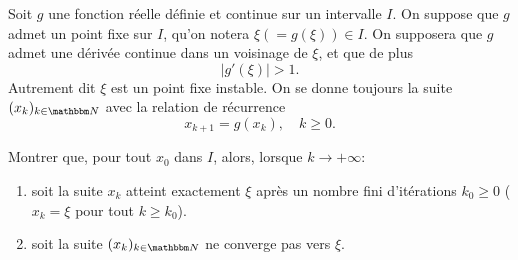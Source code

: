 \begin{exercice}

Soit $g$ une fonction réelle définie et continue sur un intervalle $I$. On suppose que $g$ admet un point fixe sur $I$,
qu'on notera $\xi (= g(\xi)) \in I$. %
On supposera que $g$ admet une dérivée continue dans un voisinage de $\xi$, et que de plus
\[
| g'(\xi) | > 1.
\]
Autrement dit $\xi$ est un point fixe instable.
On se donne toujours la suite $(x_k)_{k\in\eN}$ avec la relation de récurrence 
$$x_{k+1} = g(x_k),\quad k\geq0.$$

Montrer que, pour tout $x_0$ dans $I$, %
alors, lorsque $k\rightarrow +\infty$:
\begin{enumerate}
 \item soit la suite $x_k$ atteint exactement $\xi$ après un nombre fini d'itérations $k_0 \geq 0$ ($x_{k} = \xi$ pour tout $k \geq k_0$).
 \item soit la suite $(x_k)_{k\in\eN}$ ne converge pas vers $\xi$.
\end{enumerate}



\end{exercice}

\medskip

